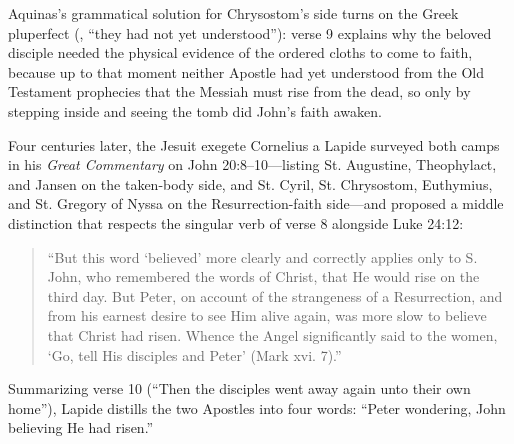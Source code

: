 Aquinas's grammatical solution for Chrysostom's side turns on the Greek pluperfect (, ``they had not yet understood''): verse 9 explains why the beloved disciple needed the physical evidence of the ordered cloths to come to faith, because up to that moment neither Apostle had yet understood from the Old Testament prophecies that the Messiah must rise from the dead, so only by stepping inside and seeing the tomb did John's faith awaken.

Four centuries later, the Jesuit exegete Cornelius a Lapide surveyed both camps in his \emph{Great Commentary} on John 20:8--10---listing St. Augustine, Theophylact, and Jansen on the taken-body side, and St. Cyril, St. Chrysostom, Euthymius, and St. Gregory of Nyssa on the Resurrection-faith side---and proposed a middle distinction that respects the singular verb of verse 8 alongside Luke 24:12:
\begin{quote}
``But this word `believed' more clearly and correctly applies only to S. John, who remembered the words of Christ, that He would rise on the third day. But Peter, on account of the strangeness of a Resurrection, and from his earnest desire to see Him alive again, was more slow to believe that Christ had risen. Whence the Angel significantly said to the women, `Go, tell His disciples and Peter' (Mark xvi. 7).''
\end{quote}
Summarizing verse 10 (``Then the disciples went away again unto their own home''), Lapide distills the two Apostles into four words: ``Peter wondering, John believing He had risen.''

